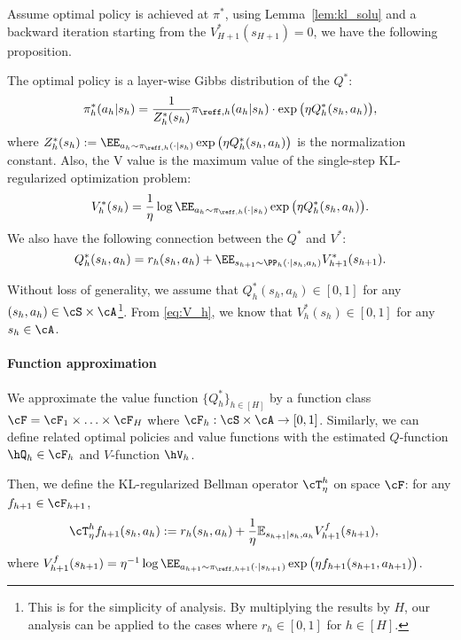 \documentclass[11pt]{article}
\newcommand{\E}{\mathbb E}
\begin{document}
Assume optimal policy is achieved at $\pi^*$, using Lemma~\ref{lem:kl_solu} and a backward iteration starting from the $V^*_{H+1}(s_{H+1})=0$, we have the following proposition.
\begin{proposition}
The optimal policy is a layer-wise Gibbs distribution of the $Q^*$:
$$
\begin{aligned}
    \pi_h^*(a_h|s_h) = \frac{1}{Z^*_h(s_h)}\pi_{\reff,h}(a_h|s_h)
\cdot \exp\big(\eta Q_h^*(s_h,a_h)\big),
\end{aligned}
$$
where $Z_h^*(s_h) := \EE_{a_h \sim \pi_{\reff,h}(\cdot |s_h)}
\exp\big(\eta Q_h^*(s_h,a_h)\big)$ is the normalization constant. Also, the V value is the maximum value of the single-step KL-regularized optimization problem:
\begin{equation}\label{eq:V_h}
    V_h^*(s_h) = \frac1\eta \log 
\EE_{a_h \sim \pi_{\reff,h}(\cdot |s_h)}
\exp\big(\eta Q_h^*(s_h,a_h)\big).
\end{equation}
We also have the following connection between the $Q^*$ and $V^*$:
\begin{equation}
    Q_h^*(s_h,a_h) = r_h(s_h,a_h) + \EE_{s_{h+1} \sim \PP_h(\cdot|s_h,a_h)}
V_{h+1}^*(s_{h+1}) .
\end{equation}
\end{proposition}
Without loss of generality, we assume that $Q_h^*(s_h,a_h)\in[0,1]$ for any $(s_h,a_h)\in\cS\times\cA$\footnote{This is for the simplicity of analysis. By multiplying the results by $H$, our analysis can be applied to the cases where $r_h\in[0,1]$ for $h\in[H]$.}. From \eqref{eq:V_h}, we know that $V_h^*(s_h)\in[0,1]$ for any $s_h\in\cA$. 

\paragraph{Function approximation}
We approximate the value function $\{Q_h^*\}_{h\in[H]}$ by a function class $\cF=\cF_1\times\ldots\times\cF_H$ where $\cF_h:\cS\times\cA\rightarrow [0,1]$. Similarly, we can define related optimal policies and value functions with the estimated $Q$-function $\hQ_h\in\cF_h$ and $V$-function $\hV_h$.

Then, we define the KL-regularized Bellman operator $\cT_\eta^h$ on space $\cF$: for any $f_{h+1}\in\cF_{h+1}$,
\begin{equation*}
\begin{aligned}
    &\cT_\eta^h f_{h+1}(s_h,a_h) := r_h(s_h,a_h) + \frac{1}{\eta}\E_{s_{h+1}|s_h,a_h} V^f_{h+1}(s_{h+1}),
\end{aligned}
\end{equation*}
where $V^f_{h+1}(s_{h+1})= \eta^{-1} \log \EE_{a_{h+1} \sim \pi_{\reff,h+1}(\cdot |s_{h+1})}
\exp\big(\eta f_{h+1}(s_{h+1},a_{h+1})\big)$.
\end{document}
